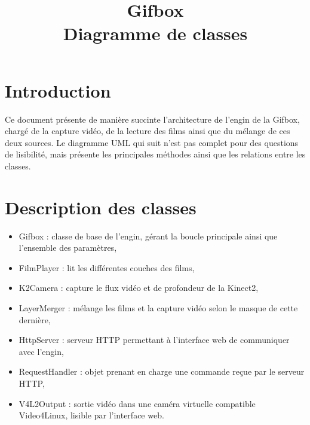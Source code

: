 \documentclass[landscape,12pt]{article}
\title{\textbf{Gifbox} \\ Diagramme de classes}
\date{}
\begin{document}
\maketitle

\section{Introduction}
Ce document présente de manière succinte l'architecture de l'engin de la Gifbox, chargé de la capture vidéo, de la lecture des films ainsi que du mélange de ces deux sources. Le diagramme UML qui suit n'est pas complet pour des questions de lisibilité, mais présente les principales méthodes ainsi que les relations entre les classes.

\section{Description des classes}
\begin{itemize}
    \item Gifbox : classe de base de l'engin, gérant la boucle principale ainsi que l'ensemble des paramètres,
    \item FilmPlayer : lit les différentes couches des films,
    \item K2Camera : capture le flux vidéo et de profondeur de la Kinect2,
    \item LayerMerger : mélange les films et la capture vidéo selon le masque de cette dernière,
    \item HttpServer : serveur HTTP permettant à l'interface web de communiquer avec l'engin,
    \item RequestHandler : objet prenant en charge une commande reçue par le serveur HTTP,
    \item V4L2Output : sortie vidéo dans une caméra virtuelle compatible Video4Linux, lisible par l'interface web.
\end{itemize}
\end{document}
